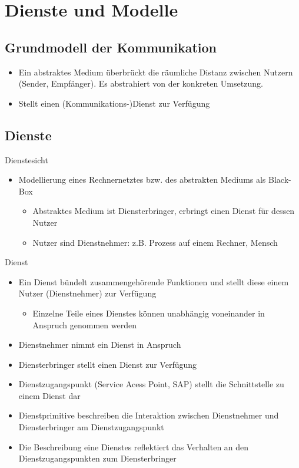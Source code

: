 \newpage
\section{Dienste und Modelle}
  \subsection{Grundmodell der Kommunikation}
    \begin{itemize}
      \item Ein abstraktes Medium überbrückt die räumliche Distanz zwischen Nutzern (Sender, Empfänger).
        Es abstrahiert von der konkreten Umsetzung.
      \item Stellt einen (Kommunikations-)Dienst zur Verfügung
    \end{itemize}
  \subsection{Dienste}
    Dienstesicht
    \begin{itemize}
      \item Modellierung eines Rechnernetztes bzw. des abstrakten Mediums als Black-Box
        \begin{itemize}
          \item Abstraktes Medium ist Diensterbringer, erbringt einen Dienst für dessen Nutzer
          \item Nutzer sind Dienstnehmer: z.B. Prozess auf einem Rechner, Mensch
        \end{itemize}
    \end{itemize}
    Dienst
    \begin{itemize}
      \item Ein Dienst bündelt zusammengehörende Funktionen und stellt diese einem Nutzer (Dienstnehmer)
        zur Verfügung
        \begin{itemize}
          \item Einzelne Teile eines Dienstes können unabhängig voneinander in Anspruch genommen werden
        \end{itemize}
      \item Dienstnehmer nimmt ein Dienst in Anspruch
      \item Diensterbringer stellt einen Dienst zur Verfügung
      \item Dienstzugangspunkt (Service Acess Point, SAP) stellt die Schnittstelle zu einem Dienst dar
      \item Dienstprimitive beschreiben die Interaktion zwischen Dienstnehmer und Diensterbringer
        am Dienstzugangspunkt
      \item Die Beschreibung eine Dienstes reflektiert das Verhalten an den Dienstzugangspunkten zum
        Diensterbringer
    \end{itemize}
